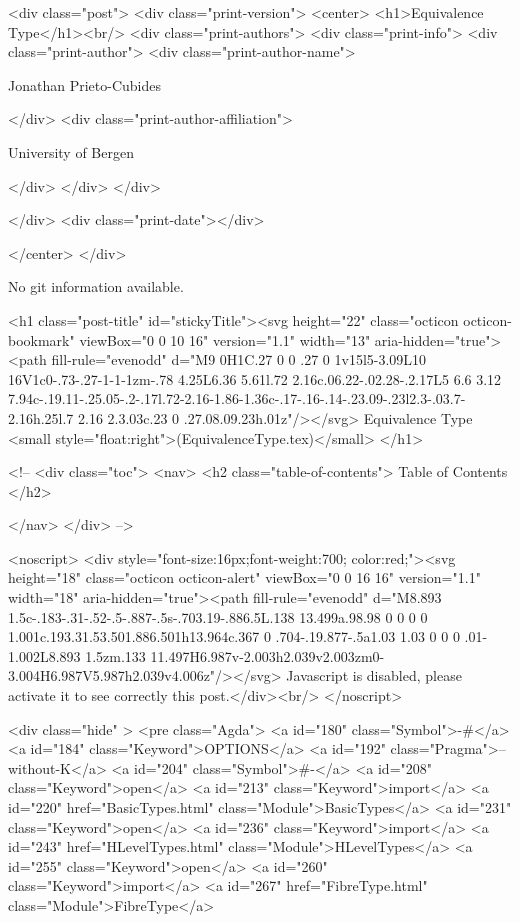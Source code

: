 <div class="post">
  <div class="print-version">
    <center>
      <h1>Equivalence Type</h1><br/>
        <div class="print-authors">
          <div class="print-info">
            <div class="print-author">
              <div class="print-author-name">
                
                  Jonathan Prieto-Cubides
                
              </div>
              <div class="print-author-affiliation">
                
                  University of Bergen
                
                </div>
            </div>
          </div>
          
          
        </div>
        <div class="print-date"></div>
        
        
    </center>
  </div>

  
  No git information available.
  

  <h1 class="post-title" id="stickyTitle"><svg height="22" class="octicon octicon-bookmark" viewBox="0 0 10 16" version="1.1" width="13" aria-hidden="true"><path fill-rule="evenodd" d="M9 0H1C.27 0 0 .27 0 1v15l5-3.09L10 16V1c0-.73-.27-1-1-1zm-.78 4.25L6.36 5.61l.72 2.16c.06.22-.02.28-.2.17L5 6.6 3.12 7.94c-.19.11-.25.05-.2-.17l.72-2.16-1.86-1.36c-.17-.16-.14-.23.09-.23l2.3-.03.7-2.16h.25l.7 2.16 2.3.03c.23 0 .27.08.09.23h.01z"/></svg> Equivalence Type <small style="float:right">(EquivalenceType.tex)</small>
  </h1>

  <!-- 
  <div class="toc">
    <nav>
    <h2 class="table-of-contents"> Table of Contents </h2>
      

    </nav>
  </div>
   -->

  <noscript>
  <div style="font-size:16px;font-weight:700; color:red;"><svg height="18" class="octicon octicon-alert" viewBox="0 0 16 16" version="1.1" width="18" aria-hidden="true"><path fill-rule="evenodd" d="M8.893 1.5c-.183-.31-.52-.5-.887-.5s-.703.19-.886.5L.138 13.499a.98.98 0 0 0 0 1.001c.193.31.53.501.886.501h13.964c.367 0 .704-.19.877-.5a1.03 1.03 0 0 0 .01-1.002L8.893 1.5zm.133 11.497H6.987v-2.003h2.039v2.003zm0-3.004H6.987V5.987h2.039v4.006z"/></svg> Javascript is disabled, please activate it to see correctly this post.</div><br/>
  </noscript>

  <div class="hide" >
<pre class="Agda">
<a id="180" class="Symbol">{-#</a> <a id="184" class="Keyword">OPTIONS</a> <a id="192" class="Pragma">--without-K</a> <a id="204" class="Symbol">#-}</a>
<a id="208" class="Keyword">open</a> <a id="213" class="Keyword">import</a> <a id="220" href="BasicTypes.html" class="Module">BasicTypes</a>
<a id="231" class="Keyword">open</a> <a id="236" class="Keyword">import</a> <a id="243" href="HLevelTypes.html" class="Module">HLevelTypes</a>
<a id="255" class="Keyword">open</a> <a id="260" class="Keyword">import</a> <a id="267" href="FibreType.html" class="Module">FibreType</a>

